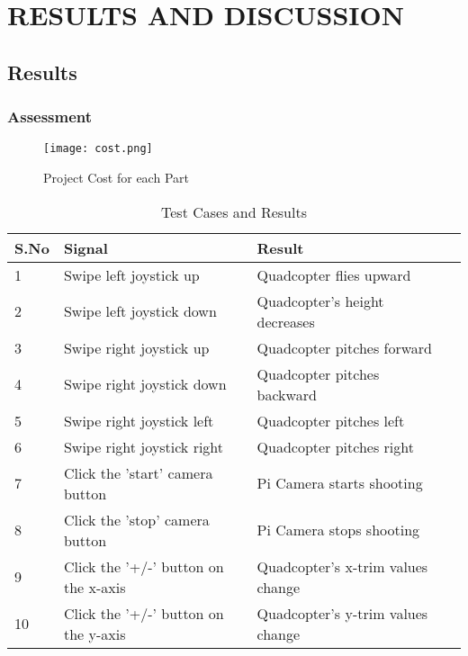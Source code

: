 
\chapter{RESULTS AND DISCUSSION} %

\section{Results}
\subsection{Assessment}


\begin{figure}[H]
  \centering
  \texttt{[image: cost.png]}
  \caption{Project Cost for each Part}
  \label{Cost wise Estimate}	
\end{figure}

\begin{table}[H]
    \begin{tabular}{ | l | l | l | p{1cm}|}
    \hline
    S.No & Signal & Result \\ \hline
    1 & Swipe left joystick up & Quadcopter flies upward \\ \hline
    2 & Swipe left joystick down &  Quadcopter's height decreases \\ \hline
    3 & Swipe right joystick up & Quadcopter pitches forward \\ \hline
    4 & Swipe right joystick down & Quadcopter pitches backward \\ \hline
 5 & Swipe right joystick left & Quadcopter pitches left \\ \hline
 6 & Swipe right joystick right & Quadcopter pitches right \\ \hline
 7 & Click the 'start' camera button & Pi Camera starts shooting \\ \hline
 8 & Click the 'stop' camera button & Pi Camera stops shooting \\ \hline
 9 & Click the '+/-' button on the x-axis & Quadcopter's x-trim values change \\ \hline
 10 & Click the '+/-' button on the y-axis & Quadcopter's y-trim values change \\ \hline
\end{tabular}
\caption{Test Cases and Results}
\label{APT}
\end{table}

